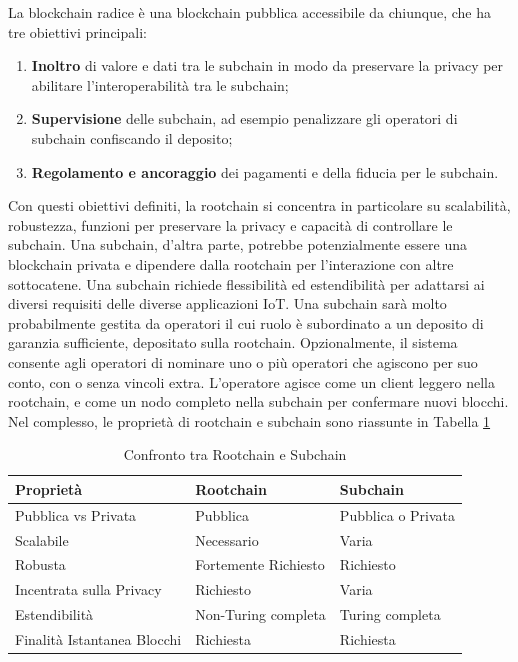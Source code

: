 La blockchain radice è una blockchain pubblica accessibile da chiunque, che ha tre obiettivi principali:

\begin{enumerate}
	\item
	      \textbf{Inoltro} di valore e dati tra le subchain in modo da preservare la privacy per abilitare l'interoperabilità tra le subchain;
	\item
	      \textbf{Supervisione} delle subchain, ad esempio penalizzare gli operatori di subchain confiscando il deposito;
	\item
	      \textbf{Regolamento e ancoraggio} dei pagamenti e della fiducia per le subchain.
\end{enumerate}
Con questi obiettivi definiti, la rootchain si concentra in particolare su scalabilità, robustezza,
funzioni per preservare la privacy e capacità di controllare le subchain.
Una subchain, d'altra parte, potrebbe potenzialmente essere una blockchain privata e dipendere dalla rootchain per l'interazione con altre sottocatene. Una subchain richiede flessibilità
ed estendibilità per adattarsi ai diversi requisiti delle diverse applicazioni IoT. Una subchain sarà molto probabilmente gestita da operatori il cui ruolo è subordinato a un deposito di garanzia sufficiente, depositato sulla rootchain. Opzionalmente, il sistema consente agli operatori di nominare uno o più operatori che agiscono per suo conto, con o senza vincoli extra. L'operatore agisce come un client leggero nella rootchain, e come un nodo completo nella subchain per
confermare nuovi blocchi.
Nel complesso, le proprietà di rootchain e subchain sono riassunte in Tabella \ref{table:rootchainandsubchains}

\begin{table}[tp]%
	\caption{Confronto tra Rootchain e Subchain}
	\label{table:rootchainandsubchains}\centering %
	\begin{tabular}{l|l|l}
		\hline
		\textbf{Proprietà}          & \textbf{Rootchain}   & \textbf{Subchain}  \\
		\hline
		Pubblica vs Privata         & Pubblica             & Pubblica o Privata \\
		Scalabile                   & Necessario           & Varia              \\
		Robusta                     & Fortemente Richiesto & Richiesto          \\
		Incentrata sulla Privacy    & Richiesto            & Varia              \\
		Estendibilità               & Non-Turing completa  & Turing completa    \\
		Finalità Istantanea Blocchi & Richiesta            & Richiesta          \\
		\hline
	\end{tabular}
\end{table}

